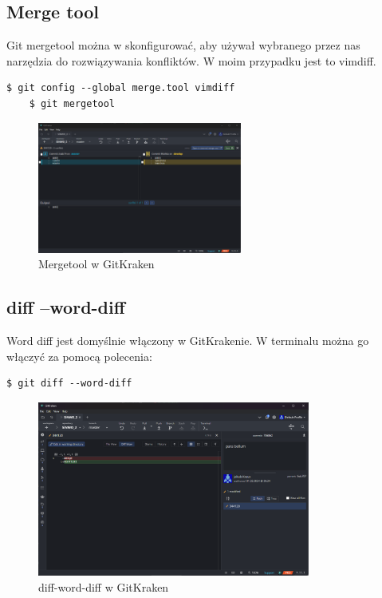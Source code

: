 \documentclass[a4paper,12pt]{article}
\begin{document}
\subsection{Merge tool}
Git mergetool można w skonfigurować, aby używał wybranego przez nas narzędzia do rozwiązywania konfliktów. W moim przypadku jest to vimdiff.
\begin{lstlisting}[caption={Komenda mergetool w terminalu},captionpos=b]
    $ git config --global merge.tool vimdiff
    $ git mergetool
\end{lstlisting}
\begin{figure}[ht]
    \centering
    \includegraphics[width=0.60\textwidth]{images/merge-tool.png}
    \caption{Mergetool w GitKraken}
\end{figure}
\subsection{diff --word-diff}
Word diff jest domyślnie włączony w GitKrakenie. W terminalu można go włączyć za pomocą polecenia:
\begin{lstlisting}[caption={diff --word-diff w terminalu},captionpos=b]
    $ git diff --word-diff
\end{lstlisting}
\begin{figure}[ht]
    \centering
    \includegraphics[width=0.8\textwidth]{images/diff.png}
    \caption{diff-word-diff w GitKraken}
\end{figure}
\end{document}
